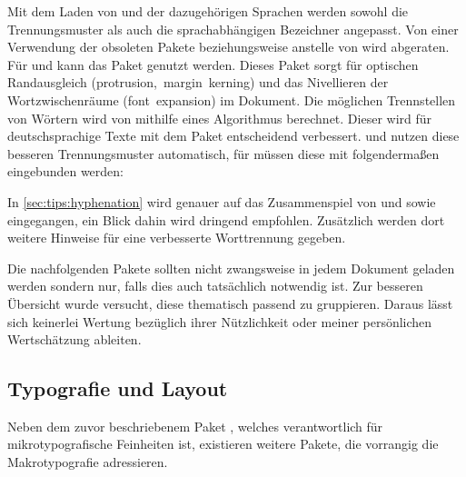 \begin{DeclarePackages}
  Mit dem Laden von  und der dazugehörigen Sprachen werden 
  sowohl die Trennungsmuster als auch die sprachabhängigen Bezeichner angepasst.
  Von einer Verwendung der obsoleten Pakete  beziehungsweise 
   anstelle von  wird abgeraten. Für 
   und  kann das Paket  
  genutzt werden.
  Dieses Paket sorgt für optischen Randausgleich (protrusion,~margin~kerning) 
  und das Nivellieren der Wortzwischenräume (font~expansion) im Dokument.
  Die möglichen Trennstellen von Wörtern wird von  mithilfe 
  eines Algorithmus berechnet. Dieser wird für deutschsprachige Texte mit dem 
  Paket  entscheidend verbessert.  und 
   nutzen diese besseren Trennungsmuster automatisch, für 
   müssen diese mit folgendermaßen eingebunden werden:
\begin{quoting}[rightmargin=0pt]
\begin{Code}
\usepackage[ngerman=ngerman-x-latest]{hyphsubst}
\end{Code}
\end{quoting}
  In \autoref{sec:tips:hyphenation} wird genauer auf das Zusammenspiel von 
   und  sowie  eingegangen, 
  ein Blick dahin wird dringend empfohlen. Zusätzlich werden dort weitere 
  Hinweise für eine verbesserte Worttrennung gegeben.
\end{DeclarePackages}



%
Die nachfolgenden Pakete sollten nicht zwangsweise in jedem Dokument geladen 
werden sondern nur, falls dies auch tatsächlich notwendig ist. Zur besseren 
Übersicht wurde versucht, diese thematisch passend zu gruppieren. Daraus lässt 
sich keinerlei Wertung bezüglich ihrer Nützlichkeit oder meiner persönlichen 
Wertschätzung ableiten.



\subsection{%
  Typografie und Layout%
}
%
Neben dem zuvor beschriebenem Paket , welches verantwortlich 
für mikrotypografische Feinheiten ist, existieren weitere Pakete, die vorrangig 
die Makrotypografie adressieren.

